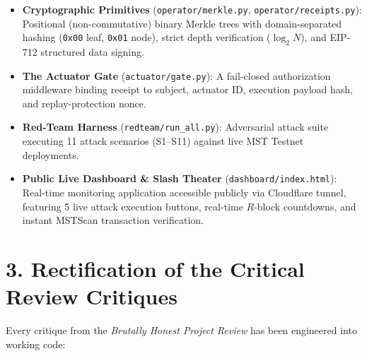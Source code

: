 \documentclass[11pt,a4paper]{article}
\begin{document}
\begin{itemize}[leftmargin=1.5em]
\begin{itemize}
        \item \texttt{watcher/auto\_watcher.py}: Autonomous watcher daemon with local SQLite receipt wallet, automatic inclusion verification after each window seal, and automated on-chain escalation.
    \end{itemize}
    \item \textbf{Cryptographic Primitives} (\texttt{operator/merkle.py}, \texttt{operator/receipts.py}):
    Positional (non-commutative) binary Merkle trees with domain-separated hashing (\texttt{0x00} leaf, \texttt{0x01} node), strict depth verification ($\log_2 N$), and EIP-712 structured data signing.
    \item \textbf{The Actuator Gate} (\texttt{actuator/gate.py}):
    A fail-closed authorization middleware binding receipt to subject, actuator ID, execution payload hash, and replay-protection nonce.
    \item \textbf{Red-Team Harness} (\texttt{redteam/run\_all.py}):
    Adversarial attack suite executing 11 attack scenarios (S1--S11) against live MST Testnet deployments.
    \item \textbf{Public Live Dashboard \& Slash Theater} (\texttt{dashboard/index.html}):
    Real-time monitoring application accessible publicly via Cloudflare tunnel, featuring 5 live attack execution buttons, real-time $R$-block countdowns, and instant MSTScan transaction verification.
\end{itemize}

\section{3. Rectification of the Critical Review Critiques}

Every critique from the \textit{Brutally Honest Project Review} has been engineered into working code:
\end{document}

